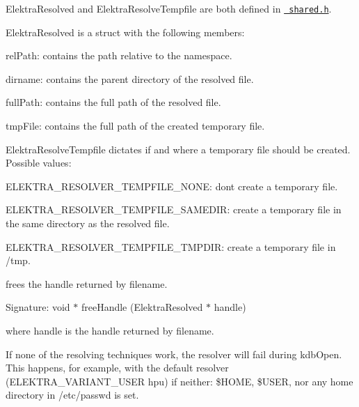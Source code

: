 {\ttfamily Elektra\+Resolved} and {\ttfamily Elektra\+Resolve\+Tempfile} are both defined in \href{/home/mpranj/workspace/libelektra/src/plugins/resolver/shared.h}{\texttt{ shared.\+h}}.

{\ttfamily Elektra\+Resolved} is a struct with the following members\+:


\begin{DoxyItemize}
\item {\ttfamily rel\+Path}\+: contains the path relative to the namespace.
\item {\ttfamily dirname}\+: contains the parent directory of the resolved file.
\item {\ttfamily full\+Path}\+: contains the full path of the resolved file.
\item {\ttfamily tmp\+File}\+: contains the full path of the created temporary file.
\end{DoxyItemize}

{\ttfamily Elektra\+Resolve\+Tempfile} dictates if and where a temporary file should be created. Possible values\+:


\begin{DoxyItemize}
\item {\ttfamily E\+L\+E\+K\+T\+R\+A\+\_\+\+R\+E\+S\+O\+L\+V\+E\+R\+\_\+\+T\+E\+M\+P\+F\+I\+L\+E\+\_\+\+N\+O\+NE}\+: don\textquotesingle{}t create a temporary file.
\item {\ttfamily E\+L\+E\+K\+T\+R\+A\+\_\+\+R\+E\+S\+O\+L\+V\+E\+R\+\_\+\+T\+E\+M\+P\+F\+I\+L\+E\+\_\+\+S\+A\+M\+E\+D\+IR}\+: create a temporary file in the same directory as the resolved file.
\item {\ttfamily E\+L\+E\+K\+T\+R\+A\+\_\+\+R\+E\+S\+O\+L\+V\+E\+R\+\_\+\+T\+E\+M\+P\+F\+I\+L\+E\+\_\+\+T\+M\+P\+D\+IR}\+: create a temporary file in {\ttfamily /tmp}.
\end{DoxyItemize}

frees the handle returned by {\ttfamily filename}.

Signature\+: {\ttfamily void $\ast$ free\+Handle (Elektra\+Resolved $\ast$ handle)}

where {\ttfamily handle} is the handle returned by {\ttfamily filename}.

If none of the resolving techniques work, the resolver will fail during {\ttfamily kdb\+Open}. This happens, for example, with the default resolver (E\+L\+E\+K\+T\+R\+A\+\_\+\+V\+A\+R\+I\+A\+N\+T\+\_\+\+U\+S\+ER {\ttfamily hpu}) if neither\+: {\ttfamily \$\+H\+O\+ME}, {\ttfamily \$\+U\+S\+ER}, nor any home directory in {\ttfamily /etc/passwd} is set. 